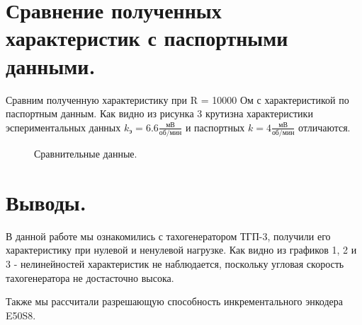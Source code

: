 \documentclass[a4paper, 11pt]{article}
\begin{document}
\section*{Сравнение полученных характеристик с паспортными данными.}
Сравним полученную характеристику при R = 10000 Ом с характеристикой по паспортным данным. Как видно из рисунка 3 крутизна характеристики эспериментальных данных $k_\text{э} = 6.6 \frac{\text{мВ}}{\text{об/мин}}$ и паспортных $k = 4 \frac{\text{мВ}}{\text{об/мин}}$ отличаются.
\begin{figure}[h!]
    \centering
    \caption{Сравнительные данные.}
\end{figure}


\section*{Выводы.}
В данной работе мы ознакомились с тахогенератором ТГП-3, получили его характеристику при нулевой и ненулевой нагрузке. Как видно из графиков 1, 2 и 3 - нелинейностей характеристик не наблюдается, поскольку угловая скорость тахогенератора не достасточно высока. \par
Также мы рассчитали разрешающую способность инкрементального энкодера E50S8.
\end{document}

